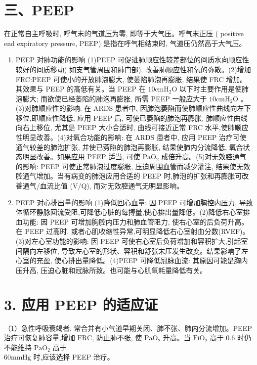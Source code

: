 \documentclass[10pt]{article}
\begin{document}
\section*{三、PEEP}
在正常自主呼吸时, 呼气末的气道压为零, 即等于大气压。呼气末正压 ( positive end expiratory pressure, PEEP) 是指在呼气相结束时, 气道压仍然高于大气压。

\begin{enumerate}
  \item PEEP 对肺功能的影响 (1)PEEP 可促进肺顺应性较差部位的间质水向顺应性较好的间质移动( 如支气管周围和肺门部), 改善肺顺应性和氧的弥散。(2)增加 FRC:PEEP 可使小的开放肺泡膨大, 使萎陷肺泡再膨胀, 结果使 FRC 增加。其效果与 PEEP 的高低有关。当 PEEP 在 $10 \mathrm{cmH}_{2} \mathrm{O}$ 以下时主要作用是使肺泡膨大; 而欲使已经萎陷的肺泡再膨胀, 所需 PEEP 一般应大于 $10 \mathrm{cmH}_{2} \mathrm{O}$ 。(3)对肺顺应性的影响: 在 ARDS 患者中, 因肺泡萎陷而使肺顺应性曲线向左下移位,即顺应性降低, 应用 PEEP 后, 可使已萎陷的肺泡再膨胀, 肺顺应性曲线向右上移位, 尤其是 PEEP 大小合适时, 曲线可接近正常 FRC 水平,使肺顺应性明显改善。(4)对氧合功能的影响: 在 ARDS 患者中, 应用 PEEP 治疗可使通气较差的肺泡扩张, 并使已䓖陷的肺泡再膨胀, 结果使肺内分流降低, 氧合状态明显改善。如果应用 PEEP 适当, 可使 $\mathrm{PaO}_{2}$ 成倍升高。(5)对无效腔通气的影响: PEEP 可使正常肺泡过度膨胀, 压迫周围血管而减少灌注, 结果使无效腔通气增加。当有病变的肺泡应用合适的 PEEP 时,肺泡的扩张和再膨胀可改善通气/血流比值 (V/Q), 而对无效腔通气无明显影响。

  \item PEEP 对心排出量的影响 (1)降低回心血量: 因 PEEP 可增加胸控内压力, 导致体循环静脉回流受阻,可降低心脏的每搏量,使心排出量降低。(2)降低右心室排血功能: 因 PEEP 可增加胸腔内压力和肺血管阻力, 使右心室的后负荷升高。在 PEEP 过高时, 或者心肌收缩性异常,可明显降低右心室射血分数(RVEF)。(3)对左心室功能的影响: 因 PEEP 可使右心室后负荷增加和容积扩大,引起室间隔向左移位, 导致左心室的形状、容积和舒张末压发生改变。结果影响了左心室的充盈, 使心排出量降低。(4)PEEP 可降低冠脉血流: 其原因可能是胸内压升高, 压迫心脏和冠脉所致。也可能与心肌氧耗量降低有关。

\end{enumerate}

\section*{3. 应用 PEEP 的适应证}
（1）急性呼吸衰竭者, 常合并有小气道早期关闭、肺不张、肺内分流增加。PEEP 治疗可恢复肺容量,增加 $\mathrm{FRC}$, 防止肺不张, 使 $\mathrm{PaO}_{2}$ 升高。当 $\mathrm{FiO}_{2}$ 高于 0.6 时仍不能维持 $\mathrm{PaO}_{2}$ 高于\\
$60 \mathrm{mmHg}$ 时,应该选择 PEEP 治疗。
\end{document}
